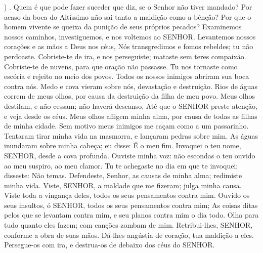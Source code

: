 { )
{} .
  Quem é que pode fazer suceder
{} que diz, se o Senhor não tiver mandado?
  Por acaso da boca do Altíssimo não sai tanto a maldição como a bênção?
  Por que o homem vivente se queixa da punição de seus próprios pecados?
  Examinemos nossos caminhos, investiguemos, e nos voltemos ao SENHOR.
  Levantemos nossos corações e as mãos a Deus nos céus,
   Nós transgredimos e fomos rebeldes; tu não perdoaste.
  Cobriste-te de ira, e nos perseguiste; mataste sem teres compaixão.
  Cobriste-te de nuvens, para que
{} oração não passasse.
  Tu nos tornaste como escória e rejeito no meio dos povos.
  Todos os nossos inimigos abriram sua boca contra nós.
  Medo e cova vieram sobre nós, devastação e destruição.
  Rios de águas correm de meus olhos, por causa da destruição da filha de meu povo.
  Meus olhos destilam, e não cessam; não haverá descanso,
  Até que o SENHOR preste atenção, e veja desde os céus.
  Meus olhos afligem minha alma, por causa de todas as filhas de minha cidade.
  Sem motivo meus inimigos me caçam como a um passarinho.
  Tentaram tirar minha vida na masmorra, e lançaram pedras sobre mim.
  As águas inundaram sobre minha cabeça; eu disse: É o meu fim.
  Invoquei o teu nome, SENHOR, desde a cova profunda.
  Ouviste minha voz: não escondas o teu ouvido ao meu suspiro, ao meu clamor.
  Tu te achegaste no dia em que te invoquei; disseste: Não temas.
  Defendeste, Senhor, as causas de minha alma; redimiste minha vida.
  Viste, SENHOR, a maldade que me fizeram; julga minha causa.
  Viste toda a vingança deles, todos os seus pensamentos contra mim.
  Ouvido os seus insultos, ó SENHOR, todos os seus pensamentos contra mim;
  As coisas ditas pelos que se levantam contra mim, e seu planos contra mim o dia todo.
  Olha para tudo quanto eles fazem;
 com canções zombam de mim.
  Retribui-lhes, SENHOR, conforme a obra de suas mãos.
  Dá-lhes angústia
 de coração, tua maldição a eles.
  Persegue-os com ira, e destrua-os de debaixo dos céus do SENHOR.
\par }

